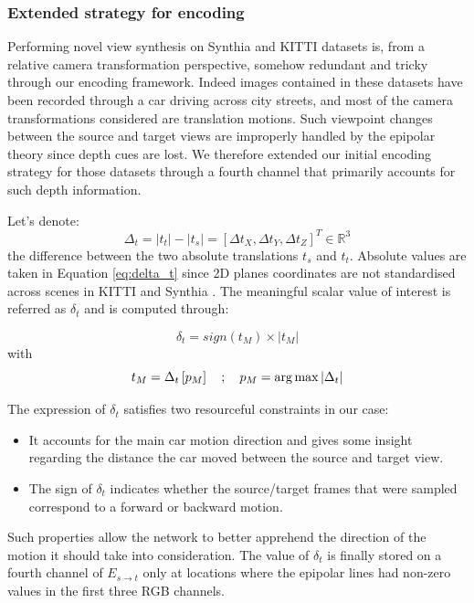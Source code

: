\subsubsection{Extended strategy for encoding}

Performing novel view synthesis on Synthia \citep{ros2016synthia} and KITTI \citep{geiger2012we} datasets is, from a relative camera transformation perspective, somehow redundant and tricky through our encoding framework. Indeed images contained in these datasets have been recorded through a car driving across city streets, and most of the camera transformations considered are translation motions. Such viewpoint changes between the source and target views are improperly handled by the epipolar theory since depth cues are lost. We therefore extended our initial encoding strategy for those datasets through a fourth channel that primarily accounts for such depth information.

Let's denote:
\begin{equation}
    \Delta_{t}= |t_{t}| - |t_{s}| = \left[\Delta t_{X},\Delta t_{Y},\Delta t_{Z} \right]^{T} \in \mathbb{R}^3
    \label{eq:delta_t}
\end{equation}
the difference between the two absolute translations $t_s$ and $t_t$. Absolute values are taken in Equation \eqref{eq:delta_t} since 2D planes coordinates are not standardised across scenes in KITTI \citep{geiger2012we} and Synthia \citep{ros2016synthia}. The meaningful scalar value of interest is referred as $\delta_{t}$ and is computed through:
 
 \begin{equation}
 \label{eq:2}
     \delta_{t} = sign(t_{M}) \times| t_{M} |
 \end{equation}
 with 
 \begin{equation}
    t_{M} = \Delta_{t}\left[p_{M}\right] \quad ; \quad p_{M}= \argmax|\Delta_{t}|
\end{equation}

The expression of $\delta_{t}$ satisfies two resourceful constraints in our case: 

\begin{itemize}
    \item It accounts for the main car motion direction and gives some insight regarding the distance the car moved between the source and target view.
    \item The sign of $\delta_{t}$ indicates whether the source/target frames that were sampled correspond to a forward or backward motion. 
\end{itemize}
Such properties allow the network to better apprehend the direction of the motion it should take into consideration. The value of  $\delta_{t}$ is finally stored on a fourth channel of $E_{s\xrightarrow{}t}$ only at locations where the epipolar lines had non-zero values in the first three RGB channels. 

